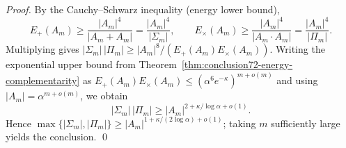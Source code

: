 \begin{proof}
By the Cauchy--Schwarz inequality (energy lower bound),
\[
E_{+}(A_m)\ge \frac{|A_m|^{4}}{|A_m+A_m|}=\frac{|A_m|^{4}}{|\Sigma_m|},\qquad
E_{\times}(A_m)\ge \frac{|A_m|^{4}}{|A_m\cdot A_m|}=\frac{|A_m|^{4}}{|\Pi_m|}.
\]
Multiplying gives
\(
|\Sigma_m|\,|\Pi_m|\ge |A_m|^{8}/(E_{+}(A_m)E_{\times}(A_m))
\).
Writing the exponential upper bound from Theorem~\ref{thm:conclusion72-energy-complementarity} as
\(
E_{+}(A_m)E_{\times}(A_m)\le (\alpha^{6}e^{-\kappa})^{m+o(m)}
\)
and using \(|A_m|=\alpha^{m+o(m)}\), we obtain
\[
|\Sigma_m|\,|\Pi_m|\ge |A_m|^{2+\kappa/\log\alpha+o(1)}.
\]
Hence \(\max\{|\Sigma_m|,|\Pi_m|\}\ge |A_m|^{1+\kappa/(2\log\alpha)+o(1)}\); taking $m$ sufficiently large yields the conclusion. \qed
\end{proof}
